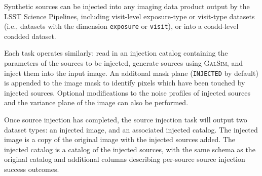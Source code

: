 Synthetic sources can be injected into any imaging data product output by the LSST Science Pipelines, including visit-level exposure-type or visit-type datasets (i.e., datasets with the dimension \texttt{exposure} or \texttt{visit}), or into a coadd-level coadded dataset.

Each task operates similarly: read in an injection catalog containing the parameters of the sources to be injected, generate sources using \textsc{GalSim}, and inject them into the input image.
An additonal mask plane (\texttt{INJECTED} by default) is appended to the image mask to identify pixels which have been touched by injected sources.
Optional modifications to the noise profiles of injected sources and the variance plane of the image can also be performed.

Once source injection has completed, the source injection task will output two dataset types: an injected image, and an associated injected catalog.
The injected image is a copy of the original image with the injected sources added.
The injected catalog is a catalog of the injected sources, with the same schema as the original catalog and additional columns describing per-source source injection success outcomes.

